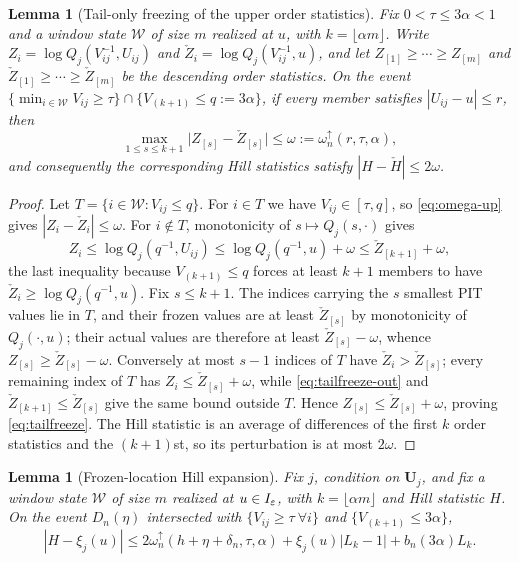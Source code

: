 \documentclass[bj,authoryear]{imsart}
\theoremstyle{plain}
\newtheorem{lemma}[theorem]{Lemma}
\begin{document}
\begin{appendix}
\begin{lemma}[Tail-only freezing of the upper order statistics]
\label{lem:app-tailfreeze}
Fix $0<\tau\le3\alpha<1$ and a window state $\mathcal W$ of size $m$
realized at $u$, with $k=\lfloor\alpha m\rfloor$.  Write
$Z_i=\log Q_j(V_{ij}^{-1},U_{ij})$ and
$\check Z_i=\log Q_j(V_{ij}^{-1},u)$, and let $Z_{[1]}\ge\cdots\ge Z_{[m]}$
and $\check Z_{[1]}\ge\cdots\ge\check Z_{[m]}$ be the descending order
statistics.  On the event $\{\min_{i\in\mathcal W}V_{ij}\ge\tau\}\cap
\{V_{(k+1)}\le q:=3\alpha\}$, if every member satisfies
$|U_{ij}-u|\le r$, then
\begin{equation}\label{eq:tailfreeze}
 \max_{1\le s\le k+1}\bigl|Z_{[s]}-\check Z_{[s]}\bigr|
 \le\omega:=\omega_n^{\uparrow}(r,\tau,\alpha),
\end{equation}
and consequently the corresponding Hill statistics satisfy
$|H-\check H|\le2\omega$.
\end{lemma}

\begin{proof}
Let $T=\{i\in\mathcal W:V_{ij}\le q\}$.  For $i\in T$ we have
$V_{ij}\in[\tau,q]$, so \eqref{eq:omega-up} gives
$|Z_i-\check Z_i|\le\omega$.  For $i\notin T$, monotonicity of
$s\mapsto Q_j(s,\cdot)$ gives
\begin{equation}\label{eq:tailfreeze-out}
 Z_i\le\log Q_j(q^{-1},U_{ij})\le\log Q_j(q^{-1},u)+\omega
 \le\check Z_{[k+1]}+\omega,
\end{equation}
the last inequality because $V_{(k+1)}\le q$ forces at least $k+1$ members
to have $\check Z_i\ge\log Q_j(q^{-1},u)$.  Fix $s\le k+1$.  The indices
carrying the $s$ smallest PIT values lie in $T$, and their frozen values
are at least $\check Z_{[s]}$ by monotonicity of $Q_j(\cdot,u)$; their
actual values are therefore at least $\check Z_{[s]}-\omega$, whence
$Z_{[s]}\ge\check Z_{[s]}-\omega$.  Conversely at most $s-1$ indices of
$T$ have $\check Z_i>\check Z_{[s]}$; every remaining index of $T$ has
$Z_i\le\check Z_{[s]}+\omega$, while \eqref{eq:tailfreeze-out} and
$\check Z_{[k+1]}\le\check Z_{[s]}$ give the same bound outside $T$.
Hence $Z_{[s]}\le\check Z_{[s]}+\omega$, proving
\eqref{eq:tailfreeze}.  The Hill statistic is an average of differences
of the first $k$ order statistics and the $(k+1)$st, so its perturbation
is at most $2\omega$.
\end{proof}

\begin{lemma}[Frozen-location Hill expansion]\label{lem:app-hill}
Fix $j$, condition on $\bm U_j$, and fix a window state $\mathcal W$ of
size $m$ realized at $u\in I_\varepsilon$, with $k=\lfloor\alpha m\rfloor$ and Hill
statistic $H$.  On the event $D_n(\eta)$ intersected with
$\{V_{ij}\ge\tau\ \forall i\}$ and $\{V_{(k+1)}\le3\alpha\}$,
\begin{equation}
 |H-\xi_j(u)|
 \le2\omega_n^{\uparrow}(h+\eta+\delta_n,\tau,\alpha)
 +\xi_j(u)|L_k-1|+b_n(3\alpha)L_k.
 \label{eq:A3app}
\end{equation}
\end{lemma}


\end{appendix}
\end{document}
